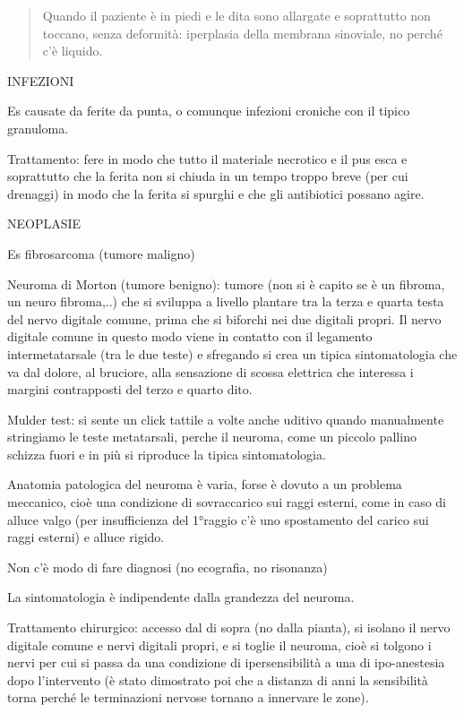 \documentclass[]{article}
\begin{document}
\begin{quote}
Quando il paziente è in piedi e le dita sono allargate e soprattutto non
toccano, senza deformità: iperplasia della membrana sinoviale, no perché
c'è liquido.
\end{quote}

INFEZIONI

Es causate da ferite da punta, o comunque infezioni croniche con il
tipico granuloma.

Trattamento: fere in modo che tutto il materiale necrotico e il pus esca
e soprattutto che la ferita non si chiuda in un tempo troppo breve (per
cui drenaggi) in modo che la ferita si spurghi e che gli antibiotici
possano agire.

NEOPLASIE

Es fibrosarcoma (tumore maligno)

Neuroma di Morton (tumore benigno): tumore (non si è capito se è un
fibroma, un neuro fibroma,..) che si sviluppa a livello plantare tra la
terza e quarta testa del nervo digitale comune, prima che si biforchi
nei due digitali propri. Il nervo digitale comune in questo modo viene
in contatto con il legamento intermetatarsale (tra le due teste) e
sfregando si crea un tipica sintomatologia che va dal dolore, al
bruciore, alla sensazione di scossa elettrica che interessa i margini
contrapposti del terzo e quarto dito.

Mulder test: si sente un click tattile a volte anche uditivo quando
manualmente stringiamo le teste metatarsali, perche il neuroma, come un
piccolo pallino schizza fuori e in più si riproduce la tipica
sintomatologia.

Anatomia patologica del neuroma è varia, forse è dovuto a un problema
meccanico, cioè una condizione di sovraccarico sui raggi esterni, come
in caso di alluce valgo (per insufficienza del 1°raggio c'è uno
spostamento del carico sui raggi esterni) e alluce rigido.

Non c'è modo di fare diagnosi (no ecografia, no risonanza)

La sintomatologia è indipendente dalla grandezza del neuroma.

Trattamento chirurgico: accesso dal di sopra (no dalla pianta), si
isolano il nervo digitale comune e nervi digitali propri, e si toglie il
neuroma, cioè si tolgono i nervi per cui si passa da una condizione di
ipersensibilità a una di ipo-anestesia dopo l'intervento (è stato
dimostrato poi che a distanza di anni la sensibilità torna perché le
terminazioni nervose tornano a innervare le zone).
\end{document}
